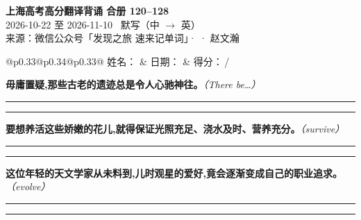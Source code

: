 \documentclass[11pt,a4paper]{article}
\newcommand{\num}[1]{\makebox[1.9em][r]{#1.}\hspace{0.3em}}
\newcommand{\wline}{\noindent\rule{\linewidth}{0.4pt}}
\newcommand{\prompt}[1]{\emph{\textcolor{tipblue}{\small（#1）}}}
\begin{document}
\pagestyle{plain}
\begin{center}
{\LARGE\bfseries 上海高考高分翻译背诵 \quad 合册 120–128}\\[0.25em]
{\large 2026-10-22 至 2026-11-10 \quad\ 默写（中 $\to$ 英）}\\[0.35em]
{\footnotesize 来源：微信公众号「发现之旅 速来记单词」·  · 赵文瀚}
\end{center}

\vspace{0.4em}
\noindent\begin{tabular}{@{}p{0.33\textwidth}@{}p{0.34\textwidth}@{}p{0.33\textwidth}@{}}
姓名：\underline{\hspace{2.0cm}} & 日期：\underline{\hspace{2.0cm}} & 得分：\underline{\hspace{1.4cm}}\,/ \\
\end{tabular}

\vspace{0.5em}

\vspace{0.8em}
\vspace{0.35em}\vspace{0.15em}

\begin{minipage}{\linewidth}

\num{1}\textbf{毋庸置疑,那些古老的遗迹总是令人心驰神往。}\prompt{There be…}

\vspace{0.3em}

\wline\vspace{0.3em}
\wline

\end{minipage}

\begin{minipage}{\linewidth}

\num{2}\textbf{要想养活这些娇嫩的花儿,就得保证光照充足、浇水及时、营养充分。}\prompt{survive}

\vspace{0.3em}

\wline\vspace{0.3em}
\wline

\end{minipage}

\begin{minipage}{\linewidth}

\num{3}\textbf{这位年轻的天文学家从未料到,儿时观星的爱好,竟会逐渐变成自己的职业追求。}\prompt{evolve}

\vspace{0.3em}

\wline\vspace{0.3em}
\wline

\end{minipage}
\end{document}
